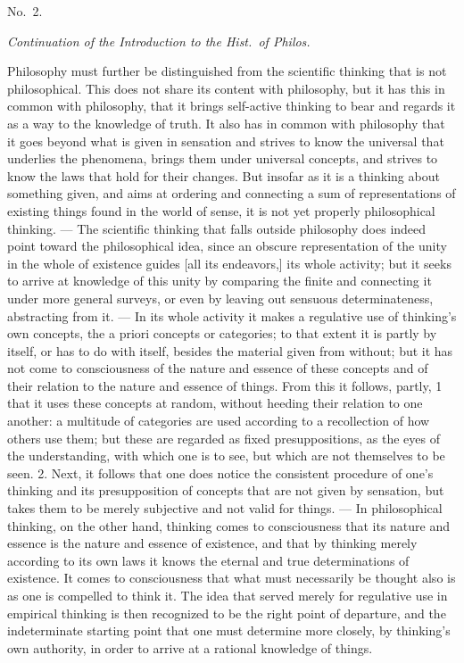 \documentclass[12pt]{article}
\newcommand{\opage}[1]{\marginnote{\footnotesize\textit{[#1]}}}
\begin{document}
\begin{flushright}\opage{3r}No.\ 2.\end{flushright}

\begin{center}\emph{Continuation of the Introduction to the Hist.\ of Philos.}\end{center}

Philosophy must further be distinguished from the scientific thinking that is not philosophical. This does not share its content with philosophy, but it has this in common with philosophy, that it brings self-active thinking to bear and regards it as a way to the knowledge of truth. It also has in common with philosophy that it goes beyond what is given in sensation and strives to know the universal that underlies the phenomena, brings them under universal concepts, and strives to know the laws that hold for their changes. But insofar as it is a thinking about something given, and aims at ordering and connecting a sum of representations of existing things found in the world of sense, it is not yet properly philosophical thinking. --- The scientific thinking that falls outside philosophy does indeed point toward the philosophical idea, since an obscure representation of the unity in the whole of existence guides [all its endeavors,] its whole activity; but it seeks to arrive at knowledge of this unity by comparing the finite and connecting it under more general surveys, or even by leaving out sensuous determinateness, abstracting from it. --- In its whole activity it makes a regulative use of thinking's own concepts, the a priori concepts or categories; to that extent it is partly by itself, or has to do with itself, besides the material given from without; but it has not come to consciousness of\opage{3v} the nature and essence of these concepts and of their relation to the nature and essence of things. From this it follows, partly, 1 that it uses these concepts at random, without heeding their relation to one another: a multitude of categories are used according to a recollection of how others use them; but these are regarded as fixed presuppositions, as the eyes of the understanding, with which one is to see, but which are not themselves to be seen. 2. Next, it follows that one does notice the consistent procedure of one's thinking and its presupposition of concepts that are not given by sensation, but takes them to be merely subjective and not valid for things. --- In philosophical thinking, on the other hand, thinking comes to consciousness that its nature and essence is the nature and essence of existence, and that by thinking merely according to its own laws it knows the eternal and true determinations of existence. It comes to consciousness that what must necessarily be thought also is as one is compelled to think it. The idea that served merely for regulative use in empirical thinking is then recognized to be the right point of departure, and the indeterminate starting point that one must determine more closely, by thinking's own authority, in order to arrive at a rational knowledge of things.
\end{document}
